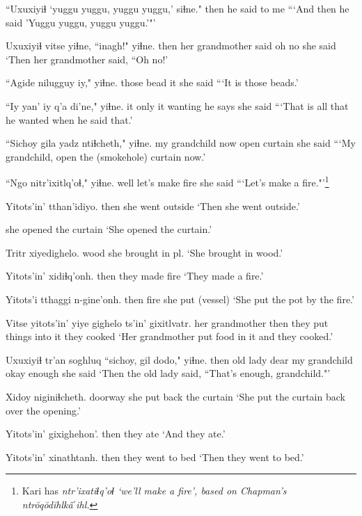 \documentclass[12pt]{article}
\begin{document}
\gll ``Uxuxiyiɬ {`yuggu yuggu, yuggu yuggu,'} siɬne."
then {} {he said to me}
\glt ```And then he said 'Yuggu yuggu, yuggu yuggu.'"'
\glend

\gll Uxuxiyiɬ vitse yiɬne, ``inagh!" yiɬne.
then {her grandmother} said {oh no} {she said}
\glt `Then her grandmother said, ``Oh no!'
\glend

\gll ``Agide nilugguy iy," yiɬne.
those bead it {she said}
\glt ```It is those beads.'
\glend

\gll ``Iy yan' iy q'a di'ne," yiɬne.
it only it wanting {he says} {she said}
\glt ```That is all that he wanted when he said that.'
\glend

\gll ``Sichoy gila {yadz ntiɬcheth,"} yiɬne.
{my grandchild} now {open curtain} {she said}
\glt ```My grandchild, open the (smokehole) curtain now.'
\glend

\gll ``Ngo nitr'ixitlq'oɬ," yiɬne.
well {let's make fire} {she said}
\glt ```Let's make a fire."'\footnote{Kari has \em ntr'ixatiɬq'oɬ \em `we'll make a fire', based on Chapman's \em ntr\u{o}q\u{o}d\u{i}hlk\^aˊihl.}
\glend

\gll Yitots'in' tthan'idiyo.
then {she went outside}
\glt `Then she went outside.'
\glend

{{she opened the curtain}}
\glt `She opened the curtain.'
\glend

\gll Tritr xiyedighelo.
wood {she brought in pl.}
\glt `She brought in wood.'
\glend

\gll Yitots'in' xidiɬq'onh.
then {they made fire}
\glt `They made a fire.'
\glend

\gll Yitots'i tthaggi n-gine'onh.
then fire {she put (vessel)}
\glt `She put the pot by the fire.'
\glend

\gll Vitse yitots'in' {yiye gighelo} ts'in' gixitlvatr.
{her grandmother} then {they put things into it} {} {they cooked}
\glt `Her grandmother put food in it and they cooked.'
\glend

\gll Uxuxiyiɬ tr'an soghluq ``sichoy, gil dodo," yiɬne.
then {old lady} dear {my grandchild} okay enough {she said}
\glt `Then the old lady said, ``That's enough, grandchild."'
\glend

\gll Xidoy niginiɬcheth.
doorway {she put back the curtain}
\glt `She put the curtain back over the opening.'
\glend

\gll Yitots'in' gixighehon'.
then {they ate}
\glt `And they ate.'
\glend

\gll Yitots'in' xinathtanh.
then {they went to bed}
\glt `Then they went to bed.'
\glend
\end{document}
